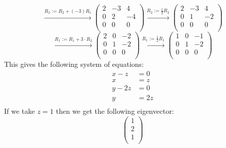 \documentclass[a4paper]{article}
\begin{document}
\begin{enumerate}
\[  \]
  \[
  \xrightarrow{R_2 := R_2 + (-3) R_1}
  \left(
  \begin{array}{rrr}
  2 & -3 & 4 \\
  0 & 2 & -4 \\
  0 & 0 & 0 \\
  \end{array}
  \right)
  \xrightarrow{R_2 := \frac{1}{2} R_2}
  \left(
  \begin{array}{rrr}
  2 & -3 & 4 \\
  0 & 1 & -2 \\
  0 & 0 & 0 \\
  \end{array}
  \right)
  \]
  \[
  \xrightarrow{R_1 := R_1 + 3 \cdot R_2}
  \left(
  \begin{array}{rrr}
  2 & 0 & -2 \\
  0 & 1 & -2 \\
  0 & 0 & 0 \\
  \end{array}
  \right)
  \xrightarrow{R_1 := \frac{1}{2} R_1}
  \left(
  \begin{array}{rrr}
  1 & 0 & -1 \\
  0 & 1 & -2 \\
  0 & 0 & 0 \\
  \end{array}
  \right)
  \]
  This gives the following system of equations:
  \begin{align*}
    x - z &= 0 \\
    x &= z \\
    y - 2z &= 0 \\
    y &= 2z \\
  \end{align*}
  If we take $z = 1$ then we get the following eigenvector:
  \[
  \left(
  \begin{array}{r}
  1 \\
  2 \\
  1 \\
  \end{array}
  \right)
  \]


\end{enumerate}
\end{document}

